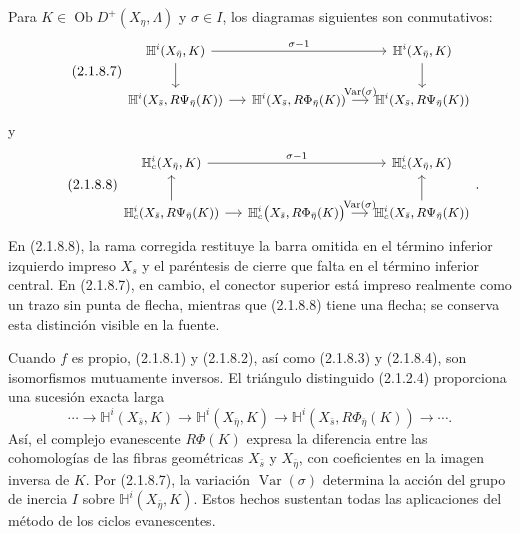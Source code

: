 Para $K\in\operatorname{Ob}D^+(X_\eta,\Lambda)$ y $\sigma\in I$, los
diagramas siguientes son conmutativos:
\begin{equation}\tag{2.1.8.7}
\begin{tikzcd}[column sep=small, cells={nodes={font=\small}}]
\mathbb H^i(X_{\bar\eta},K)
  \sisi{\arrow[rr, dash, "\sigma-1"]}{\arrow[rr, "\sigma-1"]} \arrow[d]
  & {} & \mathbb H^i(X_{\bar\eta},K) \arrow[d] \\
\mathbb H^i(X_{\bar s},R\Psi_{\bar\eta}(K)) \arrow[r]
  & \mathbb H^i(X_{\bar s},R\Phi_{\bar\eta}(K))
      \arrow[r, "\operatorname{Var}(\sigma)"]
  & \mathbb H^i(X_{\bar s},R\Psi_{\bar\eta}(K))
\end{tikzcd}
\end{equation}
y
\begin{equation}\tag{2.1.8.8}
\begin{tikzcd}[column sep=small, cells={nodes={font=\small}}]
\mathbb H_c^i(X_{\bar\eta},K)
  \arrow[rr, "\sigma-1"]
  & {} & \mathbb H_c^i(X_{\bar\eta},K) \\
\mathbb H_c^i(\sisi{X_s}{X_{\bar s}},R\Psi_{\bar\eta}(K)) \arrow[r] \arrow[u]
  & \mathbb H_c^i\bigl(X_{\bar s},R\Phi_{\bar\eta}(K)\sisi{\bigr.}{\bigr)}
      \arrow[r, "\operatorname{Var}(\sigma)"]
  & \mathbb H_c^i(X_{\bar s},R\Psi_{\bar\eta}(K)) \arrow[u]
\end{tikzcd}
.
\end{equation}
En (2.1.8.8), la rama corregida restituye la barra omitida en el término
inferior izquierdo impreso $X_s$ y el paréntesis de cierre que falta en
el término inferior central. En (2.1.8.7), en cambio, el conector superior
está impreso realmente como un trazo sin punta de flecha, mientras que
(2.1.8.8) tiene una flecha; se conserva esta distinción visible en la fuente.

Cuando $f$ es propio, (2.1.8.1) y (2.1.8.2), así como (2.1.8.3) y (2.1.8.4),
son isomorfismos mutuamente inversos. El triángulo distinguido (2.1.2.4)
proporciona una sucesión exacta larga
\begin{equation}\tag{2.1.8.9}
\cdots\longrightarrow\mathbb H^i(X_{\bar s},K)
\longrightarrow\mathbb H^i(X_{\bar\eta},K)
\longrightarrow\mathbb H^i(X_{\bar s},R\Phi_{\bar\eta}(K))
\longrightarrow\cdots.
\end{equation}
Así, el complejo evanescente $R\Phi(K)$ expresa la diferencia entre las
cohomologías de las fibras geométricas $X_{\bar s}$ y $X_{\bar\eta}$, con
coeficientes en la imagen inversa de $K$. Por (2.1.8.7), la variación
$\operatorname{Var}(\sigma)$ determina la acción del grupo de inercia $I$
sobre $\mathbb H^i(X_{\bar\eta},K)$. Estos hechos sustentan todas las
aplicaciones del método de los ciclos evanescentes.

